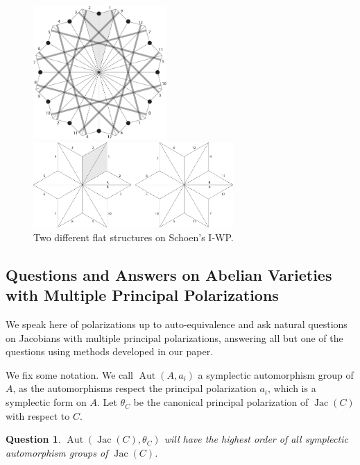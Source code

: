 \documentclass[12pt,reqno]{amsart}
\DeclareMathOperator{\Aut}{Aut}
\DeclareMathOperator{\Jac}{Jac}
\newtheorem*{question}{Question}
\theoremstyle{definition}
\theoremstyle{remark}
\begin{document}
\begin{figure}[htbp] 
\centering
\begin{minipage}{0.5\textwidth}
  \centering
  \includegraphics[width=2in]{figures/147_flat.pdf}
\end{minipage}%
\begin{minipage}{0.5\textwidth}
  \centering
  \includegraphics[width=3in]{figures/147_flat_2.pdf}
\end{minipage}
  \caption{Two different flat structures on Schoen's I-WP.}
  \label{fig:147}
\end{figure}

\subsection{Questions and Answers on Abelian Varieties with Multiple Principal Polarizations}
\label{sec:questions}


We speak here of polarizations up to auto-equivalence and ask natural questions on Jacobians with multiple principal polarizations, answering all but one of the questions using methods developed in our paper.

We fix some notation. We call $\Aut(A, a_i)$ a symplectic automorphism group of $A$, as the automorphisms respect the principal polarization $a_i$, which is a symplectic form on $A$. Let $\theta_C$ be the canonical principal polarization of $\Jac(C)$ with respect to $C$.

\begin{question} $\Aut(\Jac(C), \theta_C)$ will have the highest order of all symplectic automorphism groups of $\Jac(C)$. \end{question}
\end{document}
